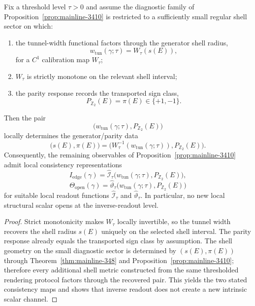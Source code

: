 \begin{theorem}
\label{thm:mainline-3411}
Fix a threshold level $\tau>0$ and assume the diagnostic family of Proposition~\ref{prop:mainline-3410} is restricted to a sufficiently small regular shell sector on which:
\begin{enumerate}[label=(\roman*)]
  \item the tunnel-width functional factors through the generator shell radius,
  \[
    w_{\mathrm{tun}}(\gamma;\tau)=W_\tau(s(E)),
  \]
  for a $C^1$ calibration map $W_\tau$;
  \item $W_\tau$ is strictly monotone on the relevant shell interval;
  \item the parity response records the transported sign class,
  \[
    P_{\mathbb Z_2}(E)=\pi(E)\in\{+1,-1\}.
  \]
\end{enumerate}
Then the pair
\[
  \bigl(w_{\mathrm{tun}}(\gamma;\tau),P_{\mathbb Z_2}(E)\bigr)
\]
locally determines the generator/parity data
\[
  \bigl(s(E),\pi(E)\bigr)
  =\bigl(W_\tau^{-1}(w_{\mathrm{tun}}(\gamma;\tau)),P_{\mathbb Z_2}(E)\bigr).
\]
Consequently, the remaining observables of Proposition~\ref{prop:mainline-3410} admit local consistency representations
\[
  I_{\mathrm{edge}}(\gamma)=\widehat{\mathcal I}_\tau\bigl(w_{\mathrm{tun}}(\gamma;\tau),P_{\mathbb Z_2}(E)\bigr),
\]
\[
  \Theta_{\mathrm{open}}(\gamma)=\widehat{\vartheta}_\tau\bigl(w_{\mathrm{tun}}(\gamma;\tau),P_{\mathbb Z_2}(E)\bigr)
\]
for suitable local readout functions $\widehat{\mathcal I}_\tau$ and $\widehat{\vartheta}_\tau$. In particular, no new local structural scalar opens at the inverse-readout level.
\end{theorem}

\begin{proof}
Strict monotonicity makes $W_\tau$ locally invertible, so the tunnel width recovers the shell radius $s(E)$ uniquely on the selected shell interval. The parity response already equals the transported sign class by assumption. The shell geometry on the small diagnostic sector is determined by $(s(E),\pi(E))$ through Theorem~\ref{thm:mainline-348} and Proposition~\ref{prop:mainline-3410}; therefore every additional shell metric constructed from the same thresholded rendering protocol factors through the recovered pair. This yields the two stated consistency maps and shows that inverse readout does not create a new intrinsic scalar channel.
\end{proof}

